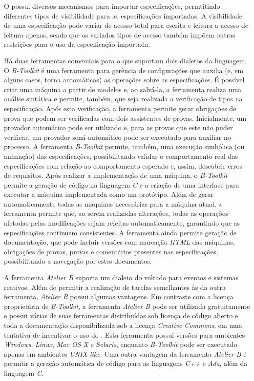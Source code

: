 O \BMethod possui diversos mecanismos para importar especificações, permtitindo diferentes tipos de visibilidade para as especificações importadas.
A visibilidade de uma especificação pode variar de acesso total para escrita e leitura a acesso de leitura apenas, sendo que os variados tipos de acesso também impõem outras restrições para o uso da especificação importada.

Há duas ferramentas comerciais para o \BMethod que suportam dois dialetos da linguagem.
O \textit{B-Toolkit}\cite{BToolkit} é uma ferramenta para gerência de configurações que auxilia (e, em alguns casos, torna automáticas) as operações sobre as especificações.
É possível criar uma máquina a partir de modelos e, ao salvá-la, a ferramenta realiza uma análise sintática e permite, também, que seja realizada a verificação de tipos na especificação.
Após esta verificação, a ferramenta permite gerar obrigações de prova que podem ser verificadas com dois assistentes de provas.
Inicialmente, um provador automático pode ser utilizado e, para as provas que este não puder verificar, um provador semi-automático pode ser executado para auxiliar no processo.
A ferramenta \textit{B-Toolkit} permite, também, uma execução simbólica (ou animação) das especificações, possibilitando validar o comportamento real das especificações com relação ao comportamento esperado e, assim, descobrir erros de requisitos.
Após realizar a implementação de uma máquina, o \textit{B-Toolkit} permite a geração de código na linguagem \textit{C} e a criação de uma interface para executar a máquina implementada como um protótipo.
Além de gerar automaticamente todas as máquinas necessárias para a máquina atual, a ferramenta permite que, ao serem realizadas alterações, todas as operações afetadas pelas modificações sejam refeitas automaticamente, garantindo que as especificações continuem consistentes.
A ferramenta ainda permite geração de documentação, que pode incluir versões com marcação \textit{HTML} das máquinas, obrigações de provas, provas e comentários presentes nas especificações, possibilitando a navegação por estes documentos.

A ferramenta \textit{Atelier B}\cite{AtelierB} suporta um dialeto do \BMethod voltado para eventos e sistemas reativos.
Além de permitir a realização de tarefas semelhantes às da outra ferramenta, \textit{Atelier B} possui algumas vantagens.
Em contraste com a licença proprietária de \textit{B-Toolkit}, a ferramenta \textit{Atelier B} pode ser utilizada gratuitamente e possui várias de suas ferramentas distribuídas sob licença de código aberto e toda a documentação disponibilizada sob a licença \textit{Creative Commons}, em uma tentativa de incentivar o uso do \BMethod.
Esta ferramenta possui versões para ambientes \textit{Windows}, \textit{Linux}, \textit{Mac OS X} e \textit{Solaris}, enquanto \textit{B-Toolkit} pode ser executado apenas em ambientes \textit{UNIX-like}.
Uma outra vantagem da ferramenta \textit{Atelier B} é permitir a geração automática de código para as linguagens \textit{C++} e \textit{Ada}, além da linguagem \textit{C}.
